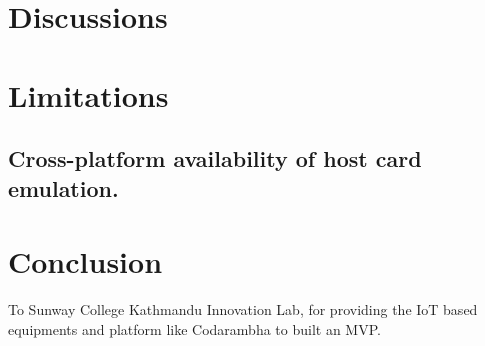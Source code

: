 \documentclass[sigconf, nonacm]{acmart}
\begin{document}
\section{Discussions}


\section{Limitations}
\subsection{Cross-platform availability of host card emulation.}

\section{Conclusion}




\begin{acks}
To Sunway College Kathmandu Innovation Lab, for providing the IoT based equipments and platform like Codarambha to built an MVP.
\end{acks}




\appendix



\end{document}
